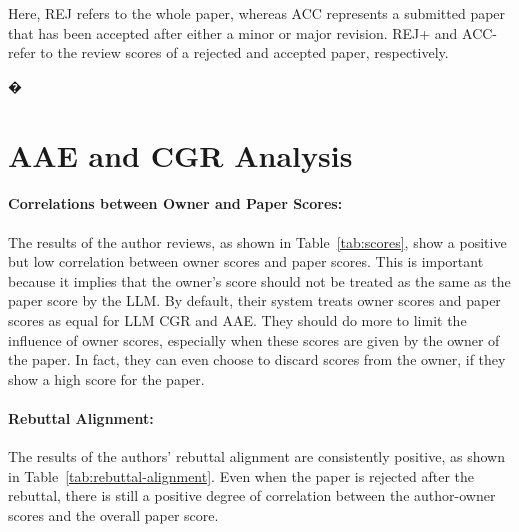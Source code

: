 \begin{minipage}[t]{\linewidth}
Here, REJ refers to the whole paper, whereas ACC represents a submitted paper that has been accepted after either a minor or major revision. REJ+ and ACC- refer to the review scores of a rejected and accepted paper, respectively.
\begin{table}[t]
\caption{The owner often gives a higher score than the author, especially when the authors are required to make a major revision.}
\label{tab:score}
\end{table}


�
\section{AAE and CGR Analysis}

\paragraph{Correlations between Owner and Paper Scores:}
The results of the author reviews, as shown in Table~\ref{tab:scores}, show a positive but low correlation between owner scores and paper scores. This is important because it implies that the owner's score should not be treated as the same as the paper score by the LLM. By default, their system treats owner scores and paper scores as equal for LLM CGR and AAE. They should do more to limit the influence of owner scores, especially when these scores are given by the owner of the paper. In fact, they can even choose to discard scores from the owner, if they show a high score for the paper. 
\paragraph{Rebuttal Alignment:}
The results of the authors' rebuttal alignment are consistently positive, as shown in Table~\ref{tab:rebuttal-alignment}. Even when the paper is rejected after the rebuttal, there is still a positive degree of correlation between the author-owner scores and the overall paper score. 


\end{minipage}
